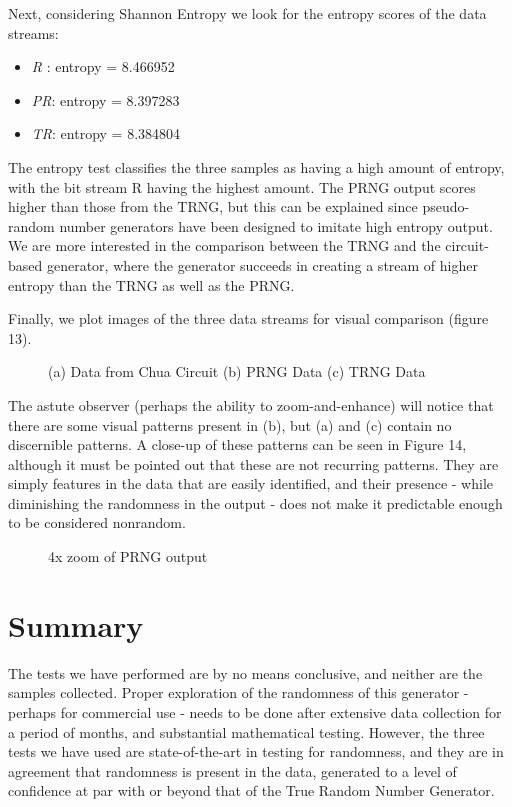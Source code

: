 \documentclass[jou,apacite]{apa6}
\begin{document}
Next, considering Shannon Entropy we look for the entropy scores of the data streams:

\begin{itemize}
\item \emph{R} : entropy = 8.466952
\item \emph{PR}: entropy = 8.397283
\item \emph{TR}: entropy = 8.384804
\end{itemize}

The entropy test classifies the three samples as having a high amount of entropy, with the bit stream R having the highest amount. The PRNG output scores higher than those from the TRNG, but this can be explained since pseudo-random number generators have been designed to imitate high entropy output. We are more interested in the comparison between the TRNG and the circuit-based generator, where the generator succeeds in creating a stream of higher entropy than the TRNG as well as the PRNG.

Finally, we plot images of the three data streams for visual comparison (figure 13).

\begin{figure}[H]
\caption{(a) Data from Chua Circuit (b) PRNG Data (c) TRNG Data}
\endminipage\hfill
{}
\endminipage\hfill
{}
\endminipage
\end{figure}

The astute observer (perhaps the ability to zoom-and-enhance) will notice that there are some visual patterns present in (b), but (a) and (c) contain no discernible patterns. A close-up of these patterns can be seen in Figure 14, although it must be pointed out that these are not recurring patterns. They are simply features in the data that are easily identified, and their presence - while diminishing the randomness in the output - does not make it predictable enough to be considered nonrandom.

\begin{figure}[H]
\caption{4x zoom of PRNG output}
\end{figure}

\section{Summary}

The tests we have performed are by no means conclusive, and neither are the samples collected. Proper exploration of the randomness of this generator - perhaps for commercial use - needs to be done after extensive data collection for a period of months, and substantial mathematical testing. However, the three tests we have used are state-of-the-art in testing for randomness, and they are in agreement that randomness is present in the data, generated to a level of confidence at par with or beyond that of the True Random Number Generator. 
\end{document}
